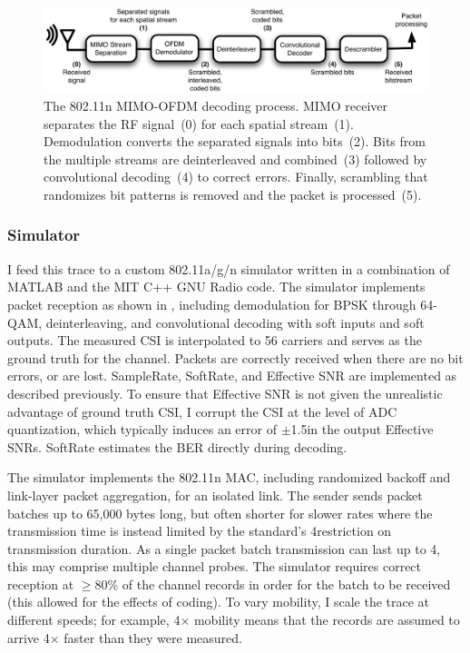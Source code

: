 \begin{figure}[ht]
\centering
\includegraphics[width=6in]{figures/esnr/mimo_ofdm_decoding_process.pdf}
\caption[The 802.11n MIMO-OFDM decoding process]{\label{fig:ofdm_decoding} The 802.11n MIMO-OFDM decoding process. MIMO receiver separates the RF signal~(0) for each spatial stream~(1). Demodulation converts the separated signals into bits~(2). Bits from the multiple streams are deinterleaved and combined~(3) followed by convolutional decoding~(4) to correct errors. Finally, scrambling that randomizes bit patterns is removed and the packet is processed~(5).}
\end{figure}


\subsubsection{Simulator} I feed this trace to a custom 802.11a/g/n simulator written in a combination of MATLAB and the MIT C++ GNU Radio code. The simulator implements packet reception as shown in , including demodulation for BPSK through 64-QAM, deinterleaving, and convolutional decoding with soft inputs and soft outputs. The measured CSI is interpolated to 56 carriers and serves as the ground truth for the channel. Packets are correctly received when there are no bit errors, or are lost. SampleRate, SoftRate, and Effective SNR are implemented as described previously. To ensure that Effective SNR is not given the unrealistic advantage of ground truth CSI, I corrupt the CSI at the level of ADC quantization, which typically induces an error of $\pm$1.5\dB in the output Effective SNRs. SoftRate estimates the BER directly during decoding.

The simulator implements the 802.11n MAC, including randomized backoff and link-layer packet aggregation, for an isolated link. The sender sends packet batches up to 65,000 bytes long, but often shorter for slower rates where the transmission time is instead limited by the standard's 4\ms restriction on transmission duration. As a single packet batch transmission can last up to 4\ms, this may comprise multiple channel probes. The simulator requires correct reception at $\geq$80\% of the channel records in order for the batch to be received (this allowed for the effects of coding). To vary mobility, I scale the trace at different speeds; for example, 4$\times$ mobility means that the records are assumed to arrive 4$\times$ faster than they were measured.


